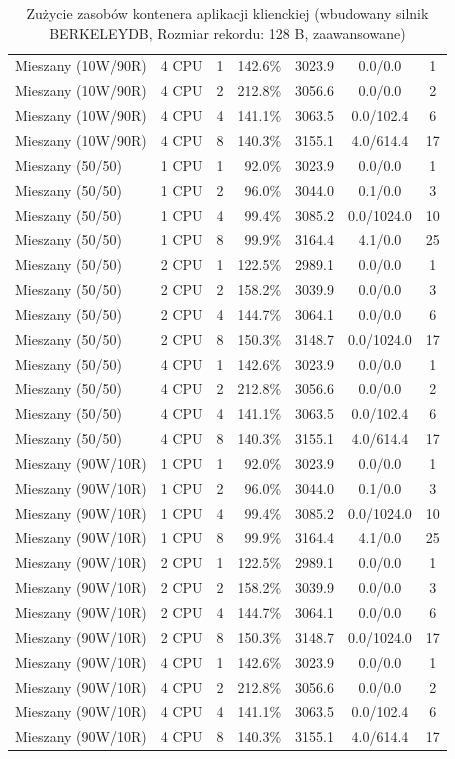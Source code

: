 \begin{table}[ht]
{\begin{tabular}{llcrrcc}
Mieszany (10W/90R) & 4 CPU & 1 & 142.6\% & 3023.9 & 0.0/0.0 & 1 \\
Mieszany (10W/90R) & 4 CPU & 2 & 212.8\% & 3056.6 & 0.0/0.0 & 2 \\
Mieszany (10W/90R) & 4 CPU & 4 & 141.1\% & 3063.5 & 0.0/102.4 & 6 \\
Mieszany (10W/90R) & 4 CPU & 8 & 140.3\% & 3155.1 & 4.0/614.4 & 17 \\
Mieszany (50/50) & 1 CPU & 1 & 92.0\% & 3023.9 & 0.0/0.0 & 1 \\
Mieszany (50/50) & 1 CPU & 2 & 96.0\% & 3044.0 & 0.1/0.0 & 3 \\
Mieszany (50/50) & 1 CPU & 4 & 99.4\% & 3085.2 & 0.0/1024.0 & 10 \\
Mieszany (50/50) & 1 CPU & 8 & 99.9\% & 3164.4 & 4.1/0.0 & 25 \\
Mieszany (50/50) & 2 CPU & 1 & 122.5\% & 2989.1 & 0.0/0.0 & 1 \\
Mieszany (50/50) & 2 CPU & 2 & 158.2\% & 3039.9 & 0.0/0.0 & 3 \\
Mieszany (50/50) & 2 CPU & 4 & 144.7\% & 3064.1 & 0.0/0.0 & 6 \\
Mieszany (50/50) & 2 CPU & 8 & 150.3\% & 3148.7 & 0.0/1024.0 & 17 \\
Mieszany (50/50) & 4 CPU & 1 & 142.6\% & 3023.9 & 0.0/0.0 & 1 \\
Mieszany (50/50) & 4 CPU & 2 & 212.8\% & 3056.6 & 0.0/0.0 & 2 \\
Mieszany (50/50) & 4 CPU & 4 & 141.1\% & 3063.5 & 0.0/102.4 & 6 \\
Mieszany (50/50) & 4 CPU & 8 & 140.3\% & 3155.1 & 4.0/614.4 & 17 \\
Mieszany (90W/10R) & 1 CPU & 1 & 92.0\% & 3023.9 & 0.0/0.0 & 1 \\
Mieszany (90W/10R) & 1 CPU & 2 & 96.0\% & 3044.0 & 0.1/0.0 & 3 \\
Mieszany (90W/10R) & 1 CPU & 4 & 99.4\% & 3085.2 & 0.0/1024.0 & 10 \\
Mieszany (90W/10R) & 1 CPU & 8 & 99.9\% & 3164.4 & 4.1/0.0 & 25 \\
Mieszany (90W/10R) & 2 CPU & 1 & 122.5\% & 2989.1 & 0.0/0.0 & 1 \\
Mieszany (90W/10R) & 2 CPU & 2 & 158.2\% & 3039.9 & 0.0/0.0 & 3 \\
Mieszany (90W/10R) & 2 CPU & 4 & 144.7\% & 3064.1 & 0.0/0.0 & 6 \\
Mieszany (90W/10R) & 2 CPU & 8 & 150.3\% & 3148.7 & 0.0/1024.0 & 17 \\
Mieszany (90W/10R) & 4 CPU & 1 & 142.6\% & 3023.9 & 0.0/0.0 & 1 \\
Mieszany (90W/10R) & 4 CPU & 2 & 212.8\% & 3056.6 & 0.0/0.0 & 2 \\
Mieszany (90W/10R) & 4 CPU & 4 & 141.1\% & 3063.5 & 0.0/102.4 & 6 \\
Mieszany (90W/10R) & 4 CPU & 8 & 140.3\% & 3155.1 & 4.0/614.4 & 17 \\
\bottomrule
\end{tabular}%
}
\caption{Zużycie zasobów kontenera aplikacji klienckiej (wbudowany silnik BERKELEYDB, Rozmiar rekordu: 128 B, zaawansowane)}
\label{tab:resources_berkeleydb_small_0}
\end{table}
